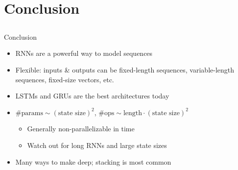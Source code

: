 \section{Conclusion}
\subsection{}

\begin{frame}{Conclusion}
    \begin{itemize}
        \item RNN{}s are a powerful way to model sequences
        \item Flexible: inputs \& outputs can be fixed-length sequences, variable-length sequences, fixed-size vectors, etc.
        \item LSTM{}s and GRU{}s are the best architectures today
        \item $\# \text{params} \sim (\text{state size})^2$,
        $\# \text{ops} \sim \text{length} \cdot (\text{state size})^2$
        \begin{itemize}
            \item Generally non-parallelizable in time
            \item Watch out for long RNN{}s and large state sizes
        \end{itemize}
        \item Many ways to make deep; stacking is most common
    \end{itemize}
\end{frame}

